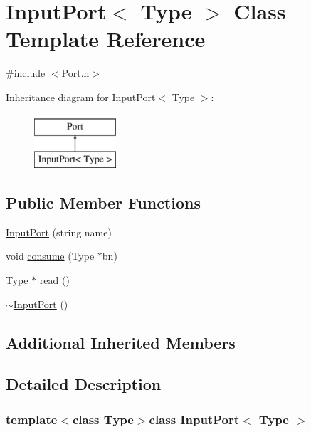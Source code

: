 \hypertarget{classInputPort}{\section{Input\-Port$<$ Type $>$ Class Template Reference}
\label{classInputPort}
}


{\ttfamily \#include $<$Port.\-h$>$}

Inheritance diagram for Input\-Port$<$ Type $>$\-:\begin{figure}[H]
\begin{center}
\leavevmode
\includegraphics[height=2.000000cm]{classInputPort}
\end{center}
\end{figure}
\subsection*{Public Member Functions}
\begin{DoxyCompactItemize}
\item 
\hyperlink{classInputPort_acf909d66728fd235b335c424d807e91c}{Input\-Port} (string name)
\item 
void \hyperlink{classInputPort_a1a2a37ffa8834ff478ea94458ee34b4f}{consume} (Type $\ast$bn)
\item 
Type $\ast$ \hyperlink{classInputPort_a1022cb16047cf6f8d5510fbdd187333c}{read} ()
\item 
\hyperlink{classInputPort_ab8ca4f0de1d52859f6b69fbe00ec7a71}{$\sim$\-Input\-Port} ()
\end{DoxyCompactItemize}
\subsection*{Additional Inherited Members}


\subsection{Detailed Description}
\subsubsection*{template$<$class Type$>$class Input\-Port$<$ Type $>$}

